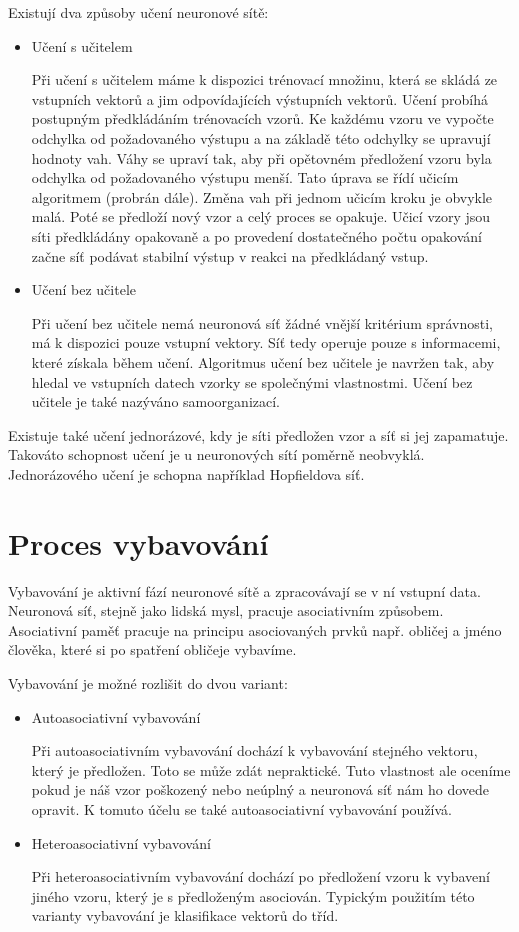 \documentclass[11pt,twoside,a4paper]{book}
\begin{document}
Existují dva způsoby učení neuronové sítě:
\begin{itemize}
\item Učení s učitelem

Při učení s učitelem máme k dispozici trénovací množinu, která se skládá ze vstupních vektorů a jim odpovídajících výstupních vektorů. Učení probíhá postupným předkládáním trénovacích vzorů. Ke každému vzoru ve vypočte odchylka od požadovaného výstupu a na základě této odchylky se upravují hodnoty vah. Váhy se upraví tak, aby při opětovném předložení vzoru byla odchylka od požadovaného výstupu menší. Tato úprava se řídí učicím algoritmem (probrán dále). Změna vah při jednom učicím kroku je obvykle malá. Poté se předloží nový vzor a celý proces se opakuje. Učicí vzory jsou síti předkládány opakovaně a po provedení dostatečného počtu opakování začne síť podávat stabilní výstup v reakci na předkládaný vstup.

\item Učení bez učitele

Při učení bez učitele nemá neuronová síť žádné vnější kritérium správnosti, má k dispozici pouze vstupní vektory. Síť tedy operuje pouze s informacemi, které získala během učení. Algoritmus učení bez učitele je navržen tak, aby hledal ve vstupních datech vzorky se společnými vlastnostmi. Učení bez učitele je také nazýváno samoorganizací.
\end{itemize}
Existuje také učení jednorázové, kdy je síti předložen vzor a síť si jej zapamatuje. Takováto schopnost učení je u neuronových sítí poměrně neobvyklá. Jednorázového učení je schopna například Hopfieldova síť.
\section{Proces vybavování}
Vybavování je aktivní fází neuronové sítě a zpracovávají se v ní vstupní data. Neuronová síť, stejně jako lidská mysl, pracuje asociativním způsobem.\citep{skripta} Asociativní paměť pracuje na principu asociovaných prvků např. obličej a jméno člověka, které si po spatření obličeje vybavíme.

Vybavování je možné rozlišit do dvou variant:
\begin{itemize}
\item Autoasociativní vybavování

Při autoasociativním vybavování dochází k vybavování stejného vektoru, který je předložen. Toto se může zdát nepraktické. Tuto vlastnost ale oceníme pokud je náš vzor poškozený nebo neúplný a neuronová síť nám ho dovede opravit. K tomuto účelu se také autoasociativní vybavování používá.
\item Heteroasociativní vybavování

Při heteroasociativním vybavování dochází po předložení vzoru k vybavení jiného vzoru, který je s předloženým asociován. Typickým použitím této varianty vybavování je klasifikace vektorů do tříd.
\end{itemize}
\end{document}
